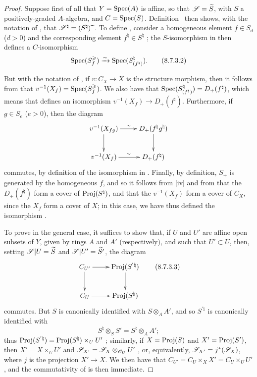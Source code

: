 \begin{proof}
Suppose first of all that $Y=\operatorname{Spec}(A)$ is affine, so that $\mathscr{S}=\widetilde{S}$, with $S$ a positively-graded $A$-algebra, and $C=\operatorname{Spec}(S)$.
Definition~ then shows, with the notation of , that $\mathscr{S}^\natural=(S^\natural){\,\widetilde{\,}\,}$.
To define , consider a homogeneous element $f\in S_d$ ($d>0$) and the corresponding element $f^\natural\in S^\natural$ ;
the $S$-isomorphism in  then defines a $C$-isomorphism
\[
\label{II.8.7.3.2}
  \operatorname{Spec}(S_f^\geqslant) \xrightarrow{\sim} \operatorname{Spec}(S_{(f^\natural)}^\natural).
\tag{8.7.3.2}
\]

But with the notation of , if $v:C_X\to X$ is the structure morphism, then it follows from  that $v^{-1}(X_f)=\operatorname{Spec}(S_f^\geqslant)$.
We also have that $\operatorname{Spec}(S_{(f^\natural)}^\natural)=D_+(f^\natural)$, which means that  defines an isomorphism $v^{-1}(X_f)\to D_+(f^\natural)$.
Furthermore, if $g\in S_e$ ($e>0$), then the diagram
\[
  \xymatrix{
    v^{-1}(X_{fg})
      \ar[r]^{\sim}
      \ar[d]
  & D_+(f^\natural g^\natural)
      \ar[d]
  \\v^{-1}(X_f)
      \ar[r]^{\sim}
  & D_+(f^\natural)
  }
\]
commutes, by definition of the isomorphism in .
Finally, by definition, $S_+$ is generated by the homogeneous $f$, and so it follows from [iv] and from  that the $D_+(f^\natural)$ form a cover of $\operatorname{Proj}(S^\natural)$, and that the $v^{-1}(X_f)$ form a cover of $C_X$, since the $X_f$ form a cover of $X$;
in this case, we have thus defined the isomorphism .

To prove  in the general case, it suffices to show that, if $U$ and $U'$ are affine open subsets of $Y$, given by rings $A$ and $A'$ (respectively), and such that $U'\subset U$, then, setting $\mathscr{S}|U=\widetilde{S}$ and $\mathscr{S}|U'=\widetilde{S'}$, the diagram
\[
\label{II.8.7.3.3}
  \xymatrix{
    C_{U'}
      \ar[r]
      \ar[d]
  & \Proj(S^{'\natural})
      \ar[d]
  \\C_U
      \ar[r]
  & \Proj(S^\natural)
  }
\tag{8.7.3.3}
\]
commutes.
But $S$ is canonically identified with $S\otimes_A A'$, and so $S^{'\natural}$ is canonically identified with
\[
  S^\natural \otimes_S S' = S^\natural \otimes_A A';
\]
thus $\operatorname{Proj}(S^{'\natural}) = \operatorname{Proj}(S^\natural)\times_U U'$ ;
similarly, if $X=\operatorname{Proj}(S)$ and $X'=\operatorname{Proj}(S')$, then $X'=X\times_U U'$ and $\mathscr{S}_{X'}=\mathscr{S}_X\otimes_{\mathscr{O}_U}U'$ , or, equivalently, $\mathscr{S}_{X'}=j^*(\mathscr{S}_X)$, where $j$ is the projection $X'\to X$.
We then  have that $C_{U'} = C_U\times_X X' = C_U\times_U U'$, and the commutativity of  is then immediate.
\end{proof}

